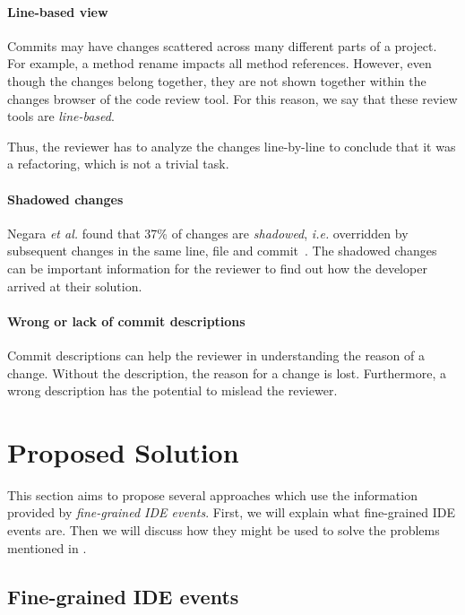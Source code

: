 \documentclass[conference,a4paper]{IEEEtran}
\begin{document}
\paragraph{Line-based view}

Commits may have changes scattered across many different parts of a
project. For example, a method rename impacts all method
references. However, even though the changes belong together, they are
not shown together within the changes browser of the code review
tool. For this reason, we say that these review tools are
\textit{line-based}.

Thus, the reviewer has to analyze the changes line-by-line to conclude
that it was a refactoring, which is not a trivial task.

\paragraph{Shadowed changes}

Negara \textit{et al.} found that 37\% of changes are
\textit{shadowed}, \textit{i.e.} overridden by subsequent changes in
the same line, file and commit~\cite{Nega12a}. The shadowed changes can
be important information for the reviewer to find out how the
developer arrived at their solution.

\paragraph{Wrong or lack of commit descriptions}

Commit descriptions can help the reviewer in understanding the reason
of a change. Without the description, the reason for a change is
lost. Furthermore, a wrong description has the potential to mislead
the reviewer.

\section{Proposed Solution}
\label{sec:proposed-solution}
This section aims to propose several approaches which use the
information provided by \textit{fine-grained IDE events}. First, we
will explain what fine-grained IDE events are. Then we will discuss
how they might be used to solve the problems mentioned in
.

\subsection{Fine-grained IDE events}
\label{sec:fine-grained-ide}
\end{document}
